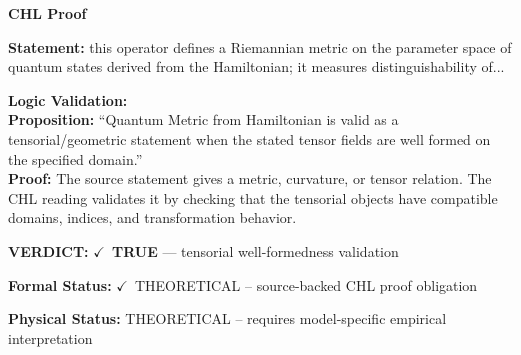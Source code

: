 \vspace{0.45em}
\noindent\textbf{CHL Proof}\par
\textbf{Statement:} this operator defines a Riemannian metric on the parameter space of quantum states
derived from the Hamiltonian; it measures distinguishability of...

\textbf{Logic Validation:}\\
\textbf{Proposition:} ``Quantum Metric from Hamiltonian is valid as a tensorial/geometric statement when the
stated tensor fields are well formed on the specified domain.''\\
\textbf{Proof:} The source statement gives a metric, curvature, or tensor relation. The CHL reading
validates it by checking that the tensorial objects have compatible domains, indices,
and transformation behavior.

\textbf{VERDICT:} \ensuremath{\checkmark}\ \textbf{TRUE} --- tensorial well-formedness validation

\textbf{Formal Status:} \ensuremath{\checkmark}\ THEORETICAL -- source-backed CHL proof obligation

\textbf{Physical Status:} THEORETICAL -- requires model-specific empirical interpretation
\par\vspace{0.45em}
\par
\ifTZPDarkEdition
{}
\fi
\endgroup
\endgroup
